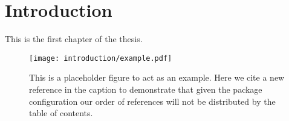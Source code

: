 \chapter{Introduction}\label{chapter:introduction}

This is the first chapter of the \gls{thesis}.~\cite{Aaboud:2016mmw,Bruning:782076}

\begin{figure}[htpb]
 \centering
 \texttt{[image: introduction/example.pdf]}
 \caption{This is a placeholder figure to act as an example.
  Here we cite a new reference in the caption to demonstrate that given the package configuration our order of references will not be distributed by the table of contents.~\cite{Higgs:1964ia}}\label{fig:test_figure}
\end{figure}
